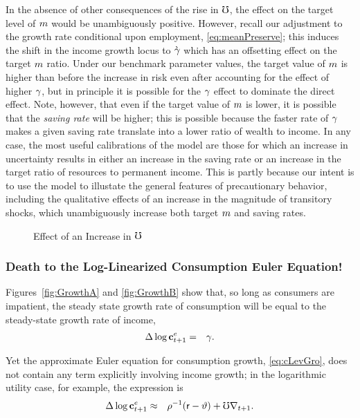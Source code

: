 \message{ !name(TractableBufferStock.tex)}\documentclass{handout}
\begin{document}
In the absence of other consequences of the rise in $\mho$, the
effect on the target level of $m$ would be unambiguously positive.
However, recall our adjustment to the growth rate conditional upon
employment, \eqref{eq:meanPreserve}; this induces the shift in the
income growth locus to $\grave{\gamma}$ which has an offsetting effect
on the target $m$ ratio.  Under our benchmark parameter values,
the target value of $m$ is higher than before the increase in risk
even after accounting for the effect of higher $\gamma$, but in
principle it is possible for the $\gamma$ effect to dominate the direct
effect.  Note, however, that even if the target value of $m$ is
lower, it is possible that the {\it saving rate} will be higher; this
is possible because the faster rate of $\gamma$ makes a given saving
rate translate into a lower ratio of wealth to income.  In any case,
the most useful calibrations of the model are those for
which an increase in uncertainty results in either an increase in the
saving rate or an increase in the target ratio of resources to
permanent income.  This is partly because our intent is to use the
model to illustate the general features of precautionary behavior,
including the qualitative effects of an increase in the magnitude of
transitory shocks, which unambiguously increase both target $m$
and saving rates.

\begin{figure}
\caption{Effect of an Increase in $\mho$}
\label{fig:cGroIncreaseMhoPlot}
\end{figure}

\subsubsection{Death to the Log-Linearized Consumption Euler Equation!}

Figures~\ref{fig:GrowthA} and \ref{fig:GrowthB} show that, so long as
consumers are impatient, the steady state growth rate of consumption
will be equal to the steady-state growth rate of income,
\begin{eqnarray}
        \Delta \log \mathbf{c}^{e}_{t+1} & = & \gamma. \label{eq:ceqg}
\end{eqnarray}

Yet the approximate Euler equation for consumption growth, \eqref{eq:cLevGro}, does 
not contain any term explicitly involving income growth; in the logarithmic utility
case, for example, the expression is
\begin{eqnarray}
         \Delta \log \mathbf{c}^{e}_{t+1} & \approx & \rho^{-1}(\mathsf{r}-\vartheta) +  \mho \nabla _{t+1}. \label{eq:cdelapprox2}
\end{eqnarray}
\end{document}
